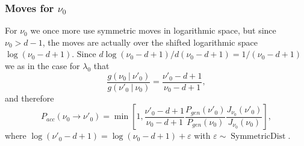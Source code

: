 \documentclass[11pt, oneside]{article}   	%
\begin{document}
\subsubsection{Moves for $\nu_0$}
For $\nu_0$ we once more use symmetric moves in logarithmic space, but since $\nu_0 > d - 1$, the moves are actually over the shifted logarithmic space $\log(\nu_0 - d + 1)$. Since $d\log(\nu_0 - d + 1)/d(\nu_0 - d + 1) = 1/(\nu_0 - d + 1)$ we as in the case for $\lambda_0$ that
$$\frac{g(\nu_0~\vert~\nu'_0)}{g(\nu'_0~\vert~\nu_0)} = \frac{\nu'_0 - d + 1}{\nu_0 - d + 1},$$
and therefore
$$P_{acc}(\nu_0\rightarrow\nu'_0) = \min\left[1, \frac{\nu'_0 - d + 1}{\nu_0 - d + 1}\frac{P_{gen}(\nu'_{0})}{P_{gen}(\nu_{0})}\frac{J_{\nu_0}(\nu'_0)}{J_{\nu_0}(\nu_0)}\right],$$
where $\log(\nu'_0 - d + 1) = \log(\nu_0 - d + 1) + \varepsilon$ with $\varepsilon \sim\operatorname{SymmetricDist}$.
\end{document}
